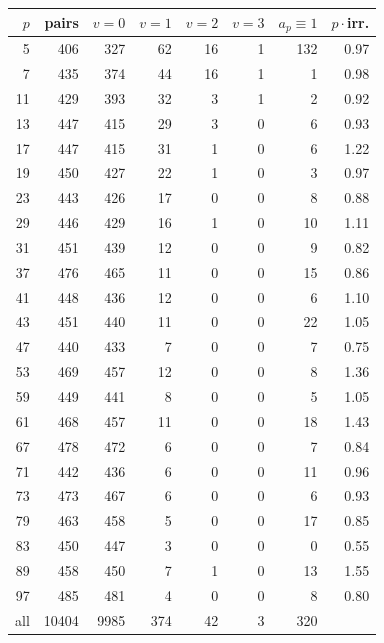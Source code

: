 \begin{tabular}{r|r|rrrr|r|r}
\hline
$p$ & pairs & $v=0$ & $v=1$ & $v=2$ & $v=3$ & $a_p\equiv1$ & $p\cdot$irr.\\ \hline
5 & 406 & 327 & 62 & 16 & 1 & 132 & 0.97\\
7 & 435 & 374 & 44 & 16 & 1 & 1 & 0.98\\
11 & 429 & 393 & 32 & 3 & 1 & 2 & 0.92\\
13 & 447 & 415 & 29 & 3 & 0 & 6 & 0.93\\
17 & 447 & 415 & 31 & 1 & 0 & 6 & 1.22\\
19 & 450 & 427 & 22 & 1 & 0 & 3 & 0.97\\
23 & 443 & 426 & 17 & 0 & 0 & 8 & 0.88\\
29 & 446 & 429 & 16 & 1 & 0 & 10 & 1.11\\
31 & 451 & 439 & 12 & 0 & 0 & 9 & 0.82\\
37 & 476 & 465 & 11 & 0 & 0 & 15 & 0.86\\
41 & 448 & 436 & 12 & 0 & 0 & 6 & 1.10\\
43 & 451 & 440 & 11 & 0 & 0 & 22 & 1.05\\
47 & 440 & 433 & 7 & 0 & 0 & 7 & 0.75\\
53 & 469 & 457 & 12 & 0 & 0 & 8 & 1.36\\
59 & 449 & 441 & 8 & 0 & 0 & 5 & 1.05\\
61 & 468 & 457 & 11 & 0 & 0 & 18 & 1.43\\
67 & 478 & 472 & 6 & 0 & 0 & 7 & 0.84\\
71 & 442 & 436 & 6 & 0 & 0 & 11 & 0.96\\
73 & 473 & 467 & 6 & 0 & 0 & 6 & 0.93\\
79 & 463 & 458 & 5 & 0 & 0 & 17 & 0.85\\
83 & 450 & 447 & 3 & 0 & 0 & 0 & 0.55\\
89 & 458 & 450 & 7 & 1 & 0 & 13 & 1.55\\
97 & 485 & 481 & 4 & 0 & 0 & 8 & 0.80\\
\hline
all & 10404 & 9985 & 374 & 42 & 3 & 320 & \\
\hline
\end{tabular}
